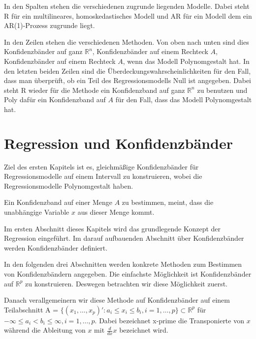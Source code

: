 \documentclass[12pt,a4paper]{article}
\theoremstyle{definition}
\theoremstyle{definition}
\theoremstyle{definition}
\theoremstyle{definition}
\begin{document}
In den Spalten stehen die verschiedenen zugrunde liegenden Modelle. Dabei steht R für ein multilineares, homoskedastisches Modell und AR für ein Modell dem ein AR(1)-Prozess zugrunde liegt.

In den Zeilen stehen die verschiedenen Methoden. Von oben nach unten sind dies Konfidenzbänder auf ganz $\mathbb{R}^n$, Konfidenzbänder auf einem Rechteck $A$, Konfidenzbänder auf einem Rechteck $A$, wenn das Modell Polynomgestalt hat. In den letzten beiden Zeilen sind die Überdeckungswahrscheinlichkeiten für den Fall, dass man überprüft, ob ein Teil des Regressionsmodells Null ist angegeben. Dabei steht R wieder für die Methode ein Konfidenzband auf ganz $\mathbb{R}^n$ zu benutzen und Poly dafür ein Konfidenzband auf $A$ für den Fall, dass das Modell Polynomgestalt hat.


\newpage
\printglossary[title=Variablenverzeichnis]



\newpage
\section{Regression und Konfidenzbänder}
\label{Regression und Konfidenzbaender}
Ziel des ersten Kapitels ist es, gleichmäßige Konfidenzbänder für Regressionsmodelle auf einem Intervall zu konstruieren, wobei die Regressionsmodelle Polynomgestalt haben. 

Ein Konfidenzband auf einer Menge $A$ zu bestimmen, meint, dass die unabhängige Variable $x$ aus dieser Menge kommt.

Im ersten Abschnitt dieses Kapitels wird das grundlegende Konzept der Regression eingeführt. Im darauf aufbauenden Abschnitt über Konfidenzbänder werden Konfidenzbänder definiert. 

In den folgenden drei Abschnitten werden konkrete Methoden zum Bestimmen von Konfidenzbändern angegeben. 
Die einfachste Möglichkeit ist Konfidenzbänder auf $\mathbb{R}^p$ zu konstruieren. Deswegen betrachten wir diese Möglichkeit zuerst.

Danach verallgemeinern wir diese Methode auf Konfidenzbänder auf einem Teilabschnitt \gls{A} = $\{(x_1, \ldots, x_p)' : a_i \leq x_i \leq b_i, i = 1, \ldots, p \} \subset \mathbb{R}^p$ für $- \infty \leq a_i < b_i \leq \infty, i=1, \ldots, p$. Dabei bezeichnet \gls{x-prime} die Transponierte von $x$ während die Ableitung von $x$ mit $\frac{d}{dx}x$ bezeichnet wird. 
\end{document}
